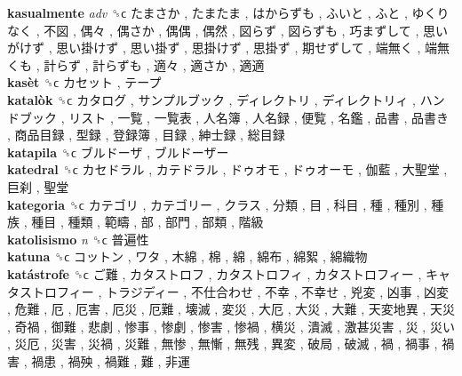 \textbf{kasualmente} \emph{adv}  ␝ϲ   たまさか ,  たまたま ,  はからずも ,  ふいと ,  ふと ,  ゆくりなく ,  不図 ,  偶々 ,  偶さか ,  偶偶 ,  偶然 ,  図らず ,  図らずも ,  巧まずして ,  思いがけず ,  思い掛けず ,  思い掛ず ,  思掛けず ,  思掛ず ,  期せずして ,  端無く ,  端無くも ,  計らず ,  計らずも ,  適々 ,  適さか ,  適適   \\
\textbf{kasèt} ␝ϲ   カセット ,  テープ   \\
\textbf{katalòk} ␝ϲ   カタログ ,  サンプルブック ,  ディレクトリ ,  ディレクトリィ ,  ハンドブック ,  リスト ,  一覧 ,  一覧表 ,  人名簿 ,  人名録 ,  便覧 ,  名鑑 ,  品書 ,  品書き ,  商品目録 ,  型録 ,  登録簿 ,  目録 ,  紳士録 ,  総目録   \\
\textbf{katapila} ␝ϲ   ブルドーザ ,  ブルドーザー   \\
\textbf{katedral} ␝ϲ   カセドラル ,  カテドラル ,  ドゥオモ ,  ドゥオーモ ,  伽藍 ,  大聖堂 ,  巨刹 ,  聖堂   \\
\textbf{kategoria} ␝ϲ   カテゴリ ,  カテゴリー ,  クラス ,  分類 ,  目 ,  科目 ,  種 ,  種別 ,  種族 ,  種目 ,  種類 ,  範疇 ,  部 ,  部門 ,  部類 ,  階級   \\
\textbf{katolisismo} \emph{n}  ␝ϲ   普遍性   \\
\textbf{katuna} ␝ϲ   コットン ,  ワタ ,  木綿 ,  棉 ,  綿 ,  綿布 ,  綿絮 ,  綿織物   \\
\textbf{katástrofe} ␝ϲ   ご難 ,  カタストロフ ,  カタストロフィ ,  カタストロフィー ,  キャタストロフィー ,  トラジディー ,  不仕合わせ ,  不幸 ,  不幸せ ,  兇変 ,  凶事 ,  凶変 ,  危難 ,  厄 ,  厄害 ,  厄災 ,  厄難 ,  壊滅 ,  変災 ,  大厄 ,  大災 ,  大難 ,  天変地異 ,  天災 ,  奇禍 ,  御難 ,  悲劇 ,  惨事 ,  惨劇 ,  惨害 ,  惨禍 ,  横災 ,  潰滅 ,  激甚災害 ,  災 ,  災い ,  災厄 ,  災害 ,  災禍 ,  災難 ,  無惨 ,  無慚 ,  無残 ,  異変 ,  破局 ,  破滅 ,  禍 ,  禍事 ,  禍害 ,  禍患 ,  禍殃 ,  禍難 ,  難 ,  非運   \\
